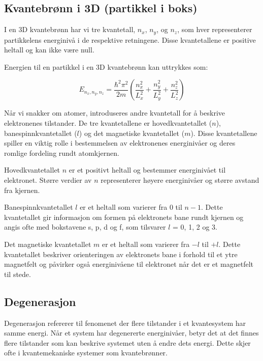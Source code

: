 \homeworkProblem[3]

\subsection*{Kvantebrønn i 3D (partikkel i boks)}

I en 3D kvantebrønn har vi tre kvantetall, $n_x$, $n_y$, og $n_z$, som hver representerer partikkelens energinivå i de respektive retningene. Disse kvantetallene er positive heltall og kan ikke være null.

Energien til en partikkel i en 3D kvantebrønn kan uttrykkes som:

\begin{equation}
E_{n_x, n_y, n_z} = \frac{\hbar^2 \pi^2}{2m} \left( \frac{n_x^2}{L_x^2} + \frac{n_y^2}{L_y^2} + \frac{n_z^2}{L_z^2} \right)
\end{equation}

Når vi snakker om atomer, introduseres andre kvantetall for å beskrive elektronenes tilstander. De tre kvantetallene er hovedkvantetallet ($n$), banespinnkvantetallet ($l$) og det magnetiske kvantetallet ($m$). Disse kvantetallene spiller en viktig rolle i bestemmelsen av elektronenes energinivåer og deres romlige fordeling rundt atomkjernen.

Hovedkvantetallet $n$ er et positivt heltall og bestemmer energinivået til elektronet. Større verdier av $n$ representerer høyere energinivåer og større avstand fra kjernen.

Banespinnkvantetallet $l$ er et heltall som varierer fra 0 til $n-1$. Dette kvantetallet gir informasjon om formen på elektronets bane rundt kjernen og angis ofte med bokstavene s, p, d og f, som tilsvarer $l$ = 0, 1, 2 og 3.

Det magnetiske kvantetallet $m$ er et heltall som varierer fra $-l$ til $+l$. Dette kvantetallet beskriver orienteringen av elektronets bane i forhold til et ytre magnetfelt og påvirker også energinivåene til elektronet når det er et magnetfelt til stede.

\subsection*{Degenerasjon}

Degenerasjon refererer til fenomenet der flere tilstander i et kvantesystem har samme energi. Når et system har degenererte energinivåer, betyr det at det finnes flere tilstander som kan beskrive systemet uten å endre dets energi. Dette skjer ofte i kvantemekaniske systemer som kvantebrønner.

